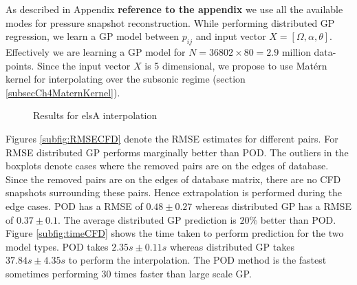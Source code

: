 As described in Appendix \textbf{reference to the appendix} we use all the available modes for pressure snapshot reconstruction. While performing distributed GP regression, we learn a GP model between \(p_{ij}\) and input vector \(X = [\Omega, \alpha, \theta]\). Effectively we are learning a GP model for \(N = 36802\times80 = 2.9\) million data-points. Since the input vector \(X\) is 5 dimensional, we propose to use Mat\'ern kernel for interpolating over the subsonic regime (section \ref{subsecCh4MaternKernel}).  

\begin{figure}[!ht]
  \centering
  \quad
  \caption{Results for elsA interpolation}
\end{figure}

Figures \ref{subfig:RMSECFD} denote the RMSE estimates for different pairs. For RMSE distributed GP performs marginally better than POD. The outliers in the boxplots denote cases where the removed pairs are on the edges of database. Since the removed pairs are on the edges of database matrix, there are no CFD snapshots surrounding these pairs. Hence extrapolation is performed during the edge cases. POD has a RMSE of \(0.48\pm0.27\) whereas distributed GP has a RMSE of \(0.37\pm0.1\). The average distributed GP prediction is \(20\%\) better than POD. Figure \ref{subfig:timeCFD} shows the time taken to perform prediction for the two model types. POD takes \(2.35s\pm0.11s\) whereas distributed GP takes \(37.84s\pm4.35s\) to perform the interpolation. The POD method is the fastest sometimes performing 30 times faster than large scale GP. 

